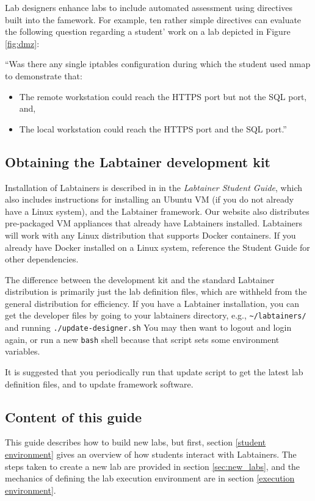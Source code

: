 \documentclass[12pt]{article}
\begin{document}
Lab designers enhance labs to include automated assessment using directives built into the famework.
For example, ten rather simple directives can evaluate the following question regarding a student'
work on a lab depicted in Figure \ref{fig:dmz}:

``Was there any
single iptables configuration during which the student used nmap to demonstrate that:
\begin{itemize}
\item The remote workstation could reach the HTTPS port but not the SQL port, and,
\item The local workstation could reach the HTTPS port and the SQL port.''
\end{itemize}

\subsection {Obtaining the Labtainer development kit}
Installation of Labtainers is described in in the \textit{Labtainer Student Guide},  
which also includes instructions for installing an Ubuntu VM (if you do not already have a Linux system),
and the Labtainer framework.  Our website also distributes pre-packaged VM appliances that already have
Labtainers installed. Labtainers will work with any Linux
distribution that supports Docker containers.  If you already have Docker installed on a Linux system, 
reference the Student Guide for other dependencies. 

The difference between the development kit and the standard Labtainer distribution is primarily
just the lab definition files, which are withheld from the general distribution for efficiency.
If you have a Labtainer installation, you can get the developer files by going to your
labtainers directory, e.g., {\tt \~{}/labtainers/} and running {\tt ./update-designer.sh}
You may then want to logout and login again, or run a new {\tt bash} shell because that script
sets some environment variables.

It is suggested that you periodically run that update script to get the latest lab definition files,
and to update framework software.   

\subsection{Content of this guide}
This guide describes how to build new labs, but first, section \ref{student environment}
gives an overview of how students interact with Labtainers.  The steps taken to
create a new lab are provided in section \ref{sec:new_labs}, and the mechanics of defining
the lab execution environment are in section \ref{execution environment}.
\end{document}
